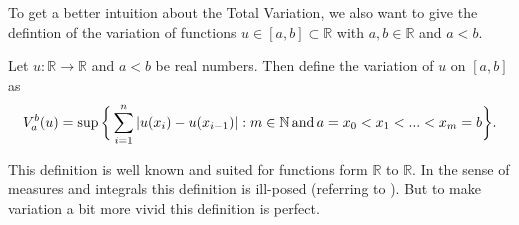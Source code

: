     To get a better intuition about the Total Variation, we also want to give the defintion of the variation of functions $u \in [a, b] \subset \mathbb{R}$ with $a, b \in \mathbb{R}$ and $a < b$.

    \begin{definition} %
    \label{def:variation_of_a_function}

        Let $u: \mathbb{R} \longrightarrow \mathbb{R}$ and $a < b$ be real numbers. Then define the variation of $u$ on $[a, b]$ as
            $$
                V^{b}_{a}(u) = \sup \bigg\{ \sum_{i = 1}^{n} |u(x_{i}) - u(x_{i - 1})| : m \in \mathbb{N} \,\textnormal{and}\, a = x_{0} < x_{1} < ... < x_{m} = b \bigg\}.
            $$

    \end{definition}

    This definition is well known and suited for functions form $\mathbb{R}$ to $\mathbb{R}$. In the sense of measures and integrals this definition is ill-posed (referring to \cite{Giusti}). But to make variation a bit more vivid this definition is perfect.

